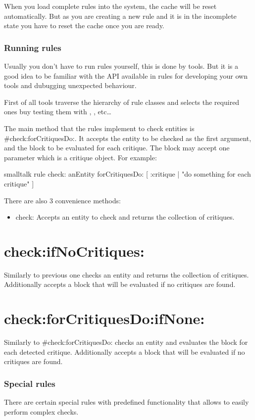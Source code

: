 \documentclass[10pt,twoside,english]{_support/latex/sbabook/sbabook}
\begin{document}
When you load complete rules into the system, the cache will be reset automatically. But as you are creating a new rule and it is in the incomplete state you have to reset the cache once you are ready.

\section{Running rules}
Usually you don't have to run rules yourself, this is done by tools. But it is a good idea to be familiar with the API available in rules for developing your own tools and dubugging unexpected behaviour.


First of all tools traverse the hierarchy of rule classes and selects the required ones buy testing them with , , etc…

The main method that the rules implement to check entities is \#check:forCritiquesDo:. It accepts the entity to be checked as the first argument, and the block to be evaluated for each critique. The block may accept one parameter which is a critique object. For example:
\begin{displaycode}{smalltalk}
rule
	check: anEntity
	forCritiquesDo: [ :critique |
		"do something for each critique" ]
\end{displaycode}


There are also 3 convenience methods:

\begin{itemize}
    \item check: Accepts an entity to check and returns the collection of critiques.
\end{itemize}

\part{check:ifNoCritiques:}
Similarly to previous one checks an entity and returns the collection of critiques. Additionally accepts a block that will be evaluated if no critiques are found.

\part{check:forCritiquesDo:ifNone:}
Similarly to \#check:forCritiquesDo: checks an entity and evaluates the block for each detected critique. Additionally accepts a block that will be evaluated if no critiques are found.

\section{Special rules}
There are certain special rules with predefined functionality that allows to easily perform complex checks.
\end{document}
